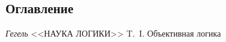 \clearpage\subsection{Оглавление}

\bigskip

{\centering
\textit{Гегель} <<НАУКА ЛОГИКИ>> T.~I. Объективная логика
\par}

\setcounter{tocdepth}{7}
\renewcommand\contentsname{}
\tableofcontents

\bigskip


\bigskip

\clearpage\setcounter{page}{1}
\bigskip

